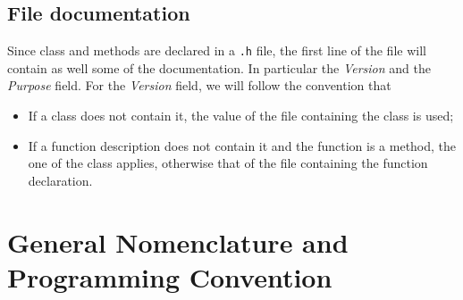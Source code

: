 \subsection{File documentation}
Since class and methods are declared in a \texttt{.h} file, the first
line of the file will contain as well some of the documentation.
In particular the \emph{Version} and the  \emph{Purpose} field.
For the \emph{Version}  field, we will follow the convention that
\begin{itemize}
\item If a class does not contain it, the value of the file
containing the class is used;
\item If a function description does not contain it and the function
is a method, the one of the class applies, otherwise that of the file
containing the function declaration.
\end{itemize}

% 
\section{General Nomenclature and Programming Convention}
